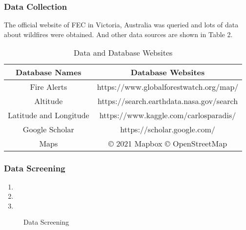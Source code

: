 \documentclass[12pt]{article}  %
\begin{document}
\subsubsection{Data Collection} %
The official website of FEC in Victoria, Australia was queried and lots of data about wildfires were obtained. And other data sources are shown in Table 2.

\begin{table}[htbp]
\begin{center}
\caption{Data and Database Websites}
\resizebox{\textwidth}{!}
{\begin{tabular}{c c}
\toprule[2pt]
\multicolumn{1}{m{5cm}}{\centering \textbf{Database Names}}
&\multicolumn{1}{m{10cm}}{\centering \textbf{Database Websites} }\\ %
\midrule
Fire Alerts& https://www.globalforestwatch.org/map/ \\
Altitude & https://search.earthdata.nasa.gov/search \\
Latitude and Longitude & https://www.kaggle.com/carlosparadis/\\ 
Google Scholar & https://scholar.google.com/ \\
Maps& \copyright{} 2021 Mapbox \copyright{} OpenStreetMap\\
\bottomrule[2pt]
\end{tabular}}
\end{center}
\end{table}

\subsubsection{Data Screening} %


\begin{enumerate}[\bfseries 1.]
	\setlength{\parsep}{0ex} %
	\setlength{\topsep}{0ex} %
	\setlength{\itemsep}{0ex} %
	\item 
	\item 
	\item 
\end{enumerate}

\begin{figure}[htbp]
    \centering    
	\caption{Data Screening} %
\end{figure}
\end{document}
